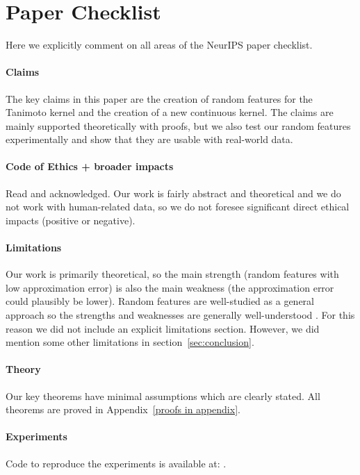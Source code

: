 \section{Paper Checklist}\label{apdx:paper checklist}

Here we explicitly comment on all areas of the NeurIPS paper checklist.

\paragraph{Claims}
The key claims in this paper are the creation of random features for the Tanimoto kernel and the creation of a new continuous kernel.
The claims are mainly supported theoretically with proofs,
but we also test our random features experimentally and show that they are usable with real-world data.

\paragraph{Code of Ethics + broader impacts}
Read and acknowledged.
Our work is fairly abstract and theoretical and we do not work with human-related data,
so we do not foresee significant direct ethical impacts
(positive or negative).

\paragraph{Limitations}
Our work is primarily theoretical, so the main strength (random features with low approximation error) is also the main weakness (the approximation error could plausibly be lower).
Random features are well-studied as a general approach so the strengths and weaknesses are generally well-understood \citep{liu2021random}.
For this reason we did not include an explicit limitations section.
However, we did mention some other limitations in section~\ref{sec:conclusion}.

\paragraph{Theory}
Our key theorems have minimal assumptions which are clearly stated.
All theorems are proved in Appendix~\ref{proofs in appendix}.

\paragraph{Experiments}
Code to reproduce the experiments is available at:\newline
\codeURL{}.

